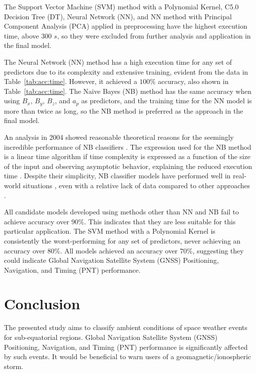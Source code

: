 \let\LaTeXcline\cline\documentclass[sn-mathphys-num]{sn-jnl}\let\cline\LaTeXcline
\begin{document}
The Support Vector Machine (SVM) method with a Polynomial Kernel, C5.0 Decision Tree (DT), Neural Network (NN), and NN method with Principal Component Analysis (PCA) applied in preprocessing have the highest execution time, above $300$ $s$, so they were excluded from further analysis and application in the final model.

The Neural Network (NN) method has a high execution time for any set of predictors due to its complexity and extensive training, evident from the data in Table~\ref{tab:acc:time}. However, it achieved a $100\%$ accuracy, also shown in Table~\ref{tab:acc:time}. The Naive Bayes (NB) method has the same accuracy when using $B_{x}$, $B_{y}$, $B_{z}$, and $a_{p}$ as predictors, and the training time for the NN model is more than twice as long, so the NB method is preferred as the approach in the final model.

An analysis in 2004 showed reasonable theoretical reasons for the seemingly incredible performance of NB classifiers \cite{Zhang2004}. The expression used for the NB method is a linear time algorithm if time complexity is expressed as a function of the size of the input and observing asymptotic behavior, explaining the reduced execution time \cite{Russell1999}. Despite their simplicity, NB classifier models have performed well in real-world situations \cite{Metsis2006}, even with a relative lack of data compared to other approaches \cite{John2013, Mccallum2001}.

All candidate models developed using methods other than NN and NB fail to achieve accuracy over $90\%$. This indicates that they are less suitable for this particular application. The SVM method with a Polynomial Kernel is consistently the worst-performing for any set of predictors, never achieving an accuracy over $80\%$. All models achieved an accuracy over $70\%$, suggesting they could indicate Global Navigation Satellite System (GNSS) Positioning, Navigation, and Timing (PNT) performance.

\section{Conclusion}
\label{sec:Conclusion}

The presented study aims to classify ambient conditions of space weather events for sub-equatorial regions. Global Navigation Satellite System (GNSS) Positioning, Navigation, and Timing (PNT) performance is significantly affected by such events. It would be beneficial to warn users of a geomagnetic/ionospheric storm.
\end{document}
